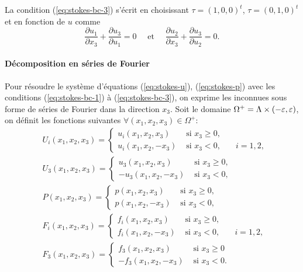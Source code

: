 La condition (\ref{eq:stokes-bc-3}) s'écrit en choisissant $\tau =
(1,0,0)^t$, $\tau = (0,1,0)^t$ et en fonction de $u$ comme
\begin{equation}
  \frac{\partial u_1}{\partial x_3} + \frac{\partial u_3}{\partial u_1}
  = 0\quad \text{ et }\quad \frac{\partial u_2}{\partial x_3} + \frac{\partial u_3}{\partial u_2}
  = 0.
\end{equation}

\paragraph{Décomposition en séries de Fourier}
Pour résoudre le système d'équations (\ref{eq:stokes-u}),
(\ref{eq:stokes-p}) avec les conditions (\ref{eq:stokes-bc-1}) à
(\ref{eq:stokes-bc-3}), on exprime les inconnues sous forme de séries
de Fourier dans la direction $x_3$. Soit le domaine $\Omega^+ = \Lambda
\times (-\varepsilon, \varepsilon)$, on définit les fonctions suivantes
$\forall (x_1, x_2, x_3)\in \Omega^+$:
\begin{align}
  & U_i(x_1, x_2, x_3) = \left\{
    \begin{array}{lll}
      u_i(x_1, x_2, x_3) &\text{ si } x_3 \geq 0,\\
      u_i(x_1, x_2, -x_3) &\text{ si } x_3 < 0,     & \quad i = 1,2,
    \end{array}
  \right.\\
  & U_3(x_1, x_2, x_3) = \left\{
    \begin{array}{ll}
       u_3(x_1, x_2, x_3) &\text{ si } x_3 \geq 0,\\
      -u_3(x_1, x_2, -x_3) &\text{ si } x_3 < 0,
    \end{array}
  \right.\\
  & P(x_1, x_2, x_3) = \left\{
    \begin{array}{ll}
      p(x_1, x_2, x_3) &\text{ si } x_3 \geq 0,\\
      p(x_1, x_2, -x_3) &\text{ si } x_3 < 0,
    \end{array}
  \right.\\
  & F_i(x_1, x_2, x_3) = \left\{
    \begin{array}{lll}
      f_i(x_1, x_2, x_3) &\text{ si } x_3 \geq 0,\\
      f_i(x_1, x_2, -x_3) &\text{ si } x_3 < 0,     & \quad i = 1,2,
    \end{array}
  \right.\\
  & F_3(x_1, x_2, x_3) = \left\{
    \begin{array}{ll}
      f_3(x_1, x_2, x_3) &\text{ si } x_3 \geq 0\\
     -f_3(x_1, x_2, -x_3) &\text{ si } x_3 < 0.
    \end{array}
  \right.
\end{align}

